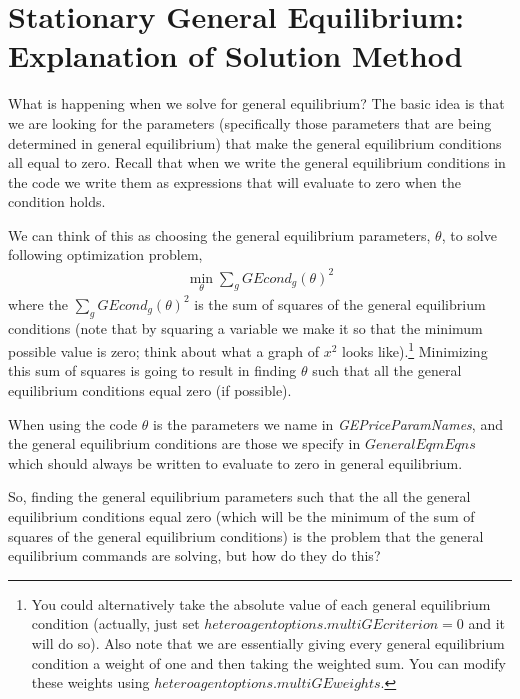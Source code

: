 \section{Stationary General Equilibrium: Explanation of Solution Method}
What is happening when we solve for general equilibrium? The basic idea is that we are looking for the parameters (specifically those parameters that are being determined in general equilibrium) that make the general equilibrium conditions all equal to zero. Recall that when we write the general equilibrium conditions in the code we write them as expressions that will evaluate to zero when the condition holds.

We can think of this as choosing the general equilibrium parameters, $\theta$, to solve following optimization problem,
\begin{eqnarray*}
 \min_{\theta} \sum_g GEcond_g(\theta)^2
\end{eqnarray*}
where the $\sum_g GEcond_g(\theta)^2$ is the sum of squares of the general equilibrium conditions (note that by squaring a variable we make it so that the minimum possible value is zero; think about what a graph of $x^2$ looks like).\footnote{You could alternatively take the absolute value of each general equilibrium condition (actually, just set $heteroagentoptions.multiGEcriterion=0$ and it will do so). Also note that we are essentially giving every general equilibrium condition a weight of one and then taking the weighted sum. You can modify these weights using $heteroagentoptions.multiGEweights$.} Minimizing this sum of squares is going to result in finding $\theta$ such that all the general equilibrium conditions equal zero (if possible).

When using the code $\theta$ is the parameters we name in \textit{GEPriceParamNames}, and the general equilibrium conditions are those we specify in $GeneralEqmEqns$ which should always be written to evaluate to zero in general equilibrium.

So, finding the general equilibrium parameters such that the all the general equilibrium conditions equal zero (which will be the minimum of the sum of squares of the general equilibrium conditions) is the problem that the general equilibrium commands are solving, but how do they do this?

